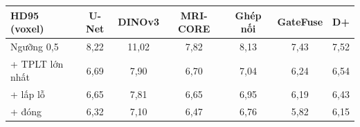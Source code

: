 \begin{tabular}{lcccccc}
\toprule
HD95 (voxel) & U-Net & DINOv3 & MRI-CORE & Ghép nối & GateFuse & D+\\
\midrule
Ngưỡng 0{,}5 & 8{,}22 & 11{,}02 & 7{,}82 & 8{,}13 & 7{,}43 & 7{,}52\\
+ TPLT lớn nhất & 6{,}69 & 7{,}90 & 6{,}70 & 7{,}04 & 6{,}24 & 6{,}54\\
+ lấp lỗ & 6{,}65 & 7{,}81 & 6{,}65 & 6{,}95 & 6{,}19 & 6{,}43\\
+ đóng & 6{,}32 & 7{,}10 & 6{,}47 & 6{,}76 & 5{,}82 & 6{,}15\\
\bottomrule
\end{tabular}